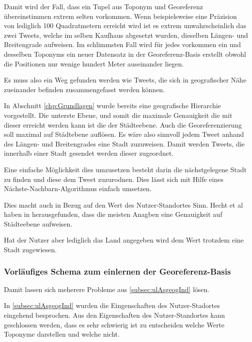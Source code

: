 						Damit wird der Fall, dass ein Tupel aus Toponym und Georeferenz übereinstimmen extrem selten vorkommen.
						Wenn beispielsweise eine Präzision von lediglich 100 Quadratmetern erreicht wird ist es extrem unwahrscheinlich das zwei Tweets, welche im selben Kaufhaus abgesetzt wurden, dieselben Längen- und Breitengrade aufweisen.
						Im schlimmsten Fall wird für jedes vorkommen ein und desselben Toponyms ein neuer Datensatz in der Georeferenz-Basis erstellt obwohl die Positionen nur wenige hundert Meter auseinander liegen.

						Es muss also ein Weg gefunden werden wie Tweets, die sich in geografischer Nähe zueinander befinden zusammengefasst werden können.

						In Abschnitt \ref{chp:Grundlagen} wurde bereits eine geografische Hierarchie vorgestellt.
						Die unterste Ebene, und somit die maximale Genauigkeit die mit dieser erreicht werden kann ist die der Städteebene.
						Auch die Georeferenzierung soll maximal auf Städtebene auflösen.
						Es wäre also sinnvoll jedem Tweet anhand des Längen- und Breitengrades eine Stadt zuzuweisen.
						Damit werden Tweets, die innerhalb einer Stadt gesendet werden dieser zugeordnet.
						
						Eine einfache Möglichkeit dies umzusetzen besteht darin die nächstgelegene Stadt zu finden und diese dem Tweet zuzurodnen.
						Dies lässt sich mit Hilfe eines Nächste-Nachbarn-Algorithmus einfach umsetzen.

						Dies macht auch in Bezug auf den Wert des Nutzer-Standortes Sinn. 
						Hecht et al haben in \cite{Hecht2011} herausgefunden, dass die meisten Anagben eine Genauigkeit auf Städteebene aufweisen.  
						
						Hat der Nutzer aber lediglich das Land angegeben wird dem Wert trotzdem eine Stadt zugewiesen.  


					\subsubsection{Vorläufiges Schema zum einlernen der Georeferenz-Basis}

					Damit lassen sich meherere Probleme aus \ref{subsec:ulAsgeogInd} lösen.

					
 

					 





					

					In \ref{subsec:ulAsgeogInd} wurden die Eingenschaften des Nutzer-Stadortes eingehend besprochen. 
					Aus den Eigenschaften des Nutzer-Standortes kann geschlossen werden, dass es sehr schwierig ist zu entscheiden welche Werte Toponyme darstellen und welche nicht.


